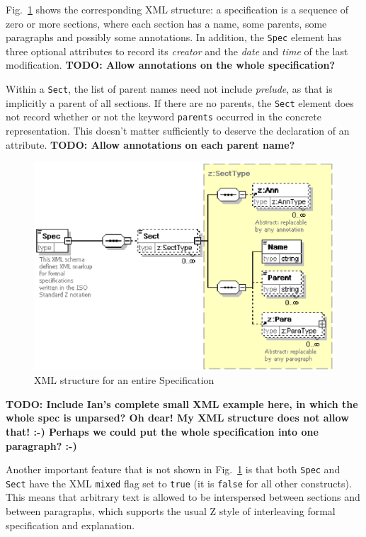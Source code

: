 \documentclass{llncs}  %
\newcommand{\AFont}[1]{\texttt{#1}}
\newcommand{\TODO}[1]{\textbf{TODO: #1}}   %
\begin{document}
Fig.~\ref{fig:spec}
shows the corresponding XML structure: a specification is a sequence of
zero or more sections, where each section has a name, some parents, 
some paragraphs and possibly some annotations.  In addition, the
\AFont{Spec} element has three optional attributes to record its
\emph{creator} and the \emph{date} and \emph{time} of the last
modification. 
\TODO{Allow annotations on the whole specification?}

Within a \AFont{Sect}, the list of parent names need not include
\textit{prelude}, as that is implicitly a parent of all sections.
If there are no parents,
the \AFont{Sect} element does not record whether or not
the keyword \AFont{parents} occurred in the concrete representation.
This doesn't matter sufficiently to deserve the declaration of an attribute.
\TODO{Allow annotations on each parent name?}

\begin{figure}[htbp]
  \centering
  \includegraphics[width=\textwidth]{spec.eps}
  \caption{XML structure for an entire Specification}
  \label{fig:spec}
\end{figure}

\TODO{Include Ian's complete small XML example here, in which
  the whole spec is unparsed?  Oh dear!  My XML structure does not
  allow that!  :-)  Perhaps we could put the whole specification into
  one paragraph?   :-)}

Another important feature that is not shown in Fig.~\ref{fig:spec} is that
both \AFont{Spec} and \AFont{Sect} have the XML \AFont{mixed} flag set to
\AFont{true} (it is \AFont{false} for all other constructs).  This means
that arbitrary text is allowed to be interspersed between sections and
between paragraphs, which supports the usual Z style of interleaving formal
specification and explanation.
\end{document}
